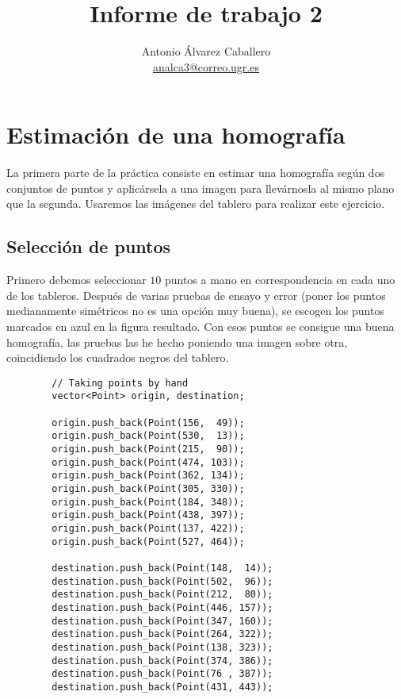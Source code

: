\documentclass[a4paper, 11pt]{article}
\title{Informe de trabajo 2}
\author{Antonio Álvarez Caballero\\
    \href{mailto:analca3@correo.ugr.es}{analca3@correo.ugr.es}}
\date{}
\theoremstyle{definition}
\begin{document}
  \maketitle

  \section{Estimación de una homografía}

    La primera parte de la práctica consiste en estimar una homografía según dos
    conjuntos de puntos y aplicársela a una imagen para llevárnosla al mismo plano que la segunda.
    Usaremos las imágenes del tablero para realizar este ejercicio.

    \subsection{Selección de puntos}

      Primero debemos seleccionar $10$ puntos a mano en correspondencia en cada uno de los tableros.
      Después de varias pruebas de ensayo y error (poner los puntos medianamente simétricos no es una opción muy buena),
      se escogen los puntos marcados en azul en la figura resultado.
      Con esos puntos se consigue una buena homografía, las pruebas las he hecho poniendo una
      imagen sobre otra, coincidiendo los cuadrados negros del tablero.

      \begin{lstlisting}
        // Taking points by hand
        vector<Point> origin, destination;

        origin.push_back(Point(156,  49));
        origin.push_back(Point(530,  13));
        origin.push_back(Point(215,  90));
        origin.push_back(Point(474, 103));
        origin.push_back(Point(362, 134));
        origin.push_back(Point(305, 330));
        origin.push_back(Point(184, 348));
        origin.push_back(Point(438, 397));
        origin.push_back(Point(137, 422));
        origin.push_back(Point(527, 464));

        destination.push_back(Point(148,  14));
        destination.push_back(Point(502,  96));
        destination.push_back(Point(212,  80));
        destination.push_back(Point(446, 157));
        destination.push_back(Point(347, 160));
        destination.push_back(Point(264, 322));
        destination.push_back(Point(138, 323));
        destination.push_back(Point(374, 386));
        destination.push_back(Point(76 , 387));
        destination.push_back(Point(431, 443));
      \end{lstlisting}
\end{document}
